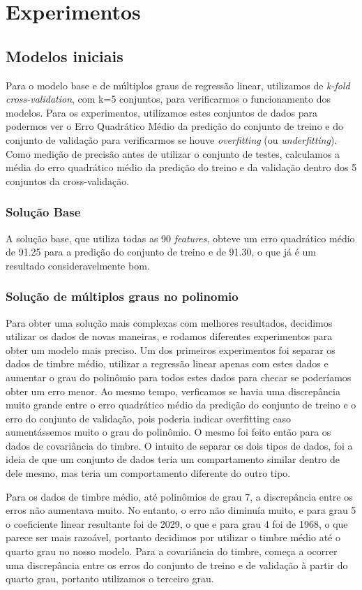 \documentclass[conference]{IEEEtran}
\begin{document}
\section{Experimentos}
\subsection{Modelos iniciais}
Para o modelo base e de múltiplos graus de regressão linear, utilizamos de \textit{k-fold cross-validation}, com k=5 conjuntos, para verificarmos o funcionamento dos modelos. Para os experimentos, utilizamos estes conjuntos de dados para podermos ver o Erro Quadrático Médio da predição do conjunto de treino e do conjunto de validação para verificarmos se houve \textit{overfitting} (ou \textit{underfitting}). Como medição de precisão antes de utilizar o conjunto de testes, calculamos a média do erro quadrático médio da predição do treino e da validação dentro dos 5 conjuntos da cross-validação.

\subsubsection{Solução Base}
A solução base, que utiliza todas as 90 \textit{features}, obteve um erro quadrático médio de 91.25 para a predição do conjunto de treino e de 91.30, o que já é um resultado consideravelmente bom.

\subsubsection{Solução de múltiplos graus no polinomio}
Para obter uma solução mais complexas com melhores resultados, decidimos utilizar os dados de novas maneiras, e rodamos diferentes experimentos para obter um modelo mais preciso. Um dos primeiros experimentos foi separar os dados de timbre médio, utilizar a regressão linear apenas com estes dados e aumentar o grau do polinômio para todos estes dados para checar se poderíamos obter um erro menor. Ao mesmo tempo, verficamos se havia uma discrepância muito grande entre o erro quadrático médio da predição do conjunto de treino e o erro do conjunto de validação, pois poderia indicar overfitting caso aumentássemos muito o grau do polinômio. O mesmo foi feito então para os dados de covariância do timbre. O intuito de separar os dois tipos de dados, foi a ideia de que um conjunto de dados teria um compartamento similar dentro de dele mesmo, mas teria um comportamento diferente do outro tipo.

Para os dados de timbre médio, até polinômios de grau 7, a discrepância entre os erros não aumentava muito. No entanto, o erro não diminuía muito, e para grau 5 o coeficiente linear resultante foi de 2029, o que e para grau 4 foi de 1968, o que parece ser mais razoável, portanto decidimos por utilizar o timbre médio até o quarto grau no nosso modelo. Para a covariância do timbre, começa a ocorrer uma discrepância entre os erros do conjunto de treino e de validação à partir do quarto grau, portanto utilizamos o terceiro grau.
\end{document}
